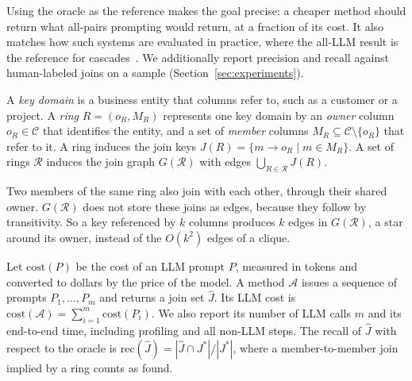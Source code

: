 Using the oracle as the reference makes the goal precise: a cheaper method should return what all-pairs prompting would return, at a fraction of its cost.
It also matches how such systems are evaluated in practice, where the all-LLM result is the reference for cascades~\cite{SUPG,BARGAIN,FDJ}.
We additionally report precision and recall against human-labeled joins on a sample (Section~\ref{sec:experiments}).

\begin{definition}
A \emph{key domain} is a business entity that columns refer to, such as a customer or a project.
A \emph{ring} $R = (o_R, M_R)$ represents one key domain by an \emph{owner} column $o_R \in \mathcal{C}$ that identifies the entity, and a set of \emph{member} columns $M_R \subseteq \mathcal{C} \setminus \{o_R\}$ that refer to it.
A ring induces the join keys $J(R) = \{ m \rightarrow o_R \mid m \in M_R \}$.
A set of rings $\mathcal{R}$ induces the join graph $G(\mathcal{R})$ with edges $\bigcup_{R \in \mathcal{R}} J(R)$.
\end{definition}

Two members of the same ring also join with each other, through their shared owner.
$G(\mathcal{R})$ does not store these joins as edges, because they follow by transitivity.
So a key referenced by $k$ columns produces $k$ edges in $G(\mathcal{R})$, a star around its owner, instead of the $O(k^2)$ edges of a clique.

 Let $\mathrm{cost}(P)$ be the cost of an LLM prompt $P$, measured in tokens and converted to dollars by the price of the model.
A method $\mathcal{A}$ issues a sequence of prompts $P_1, \ldots, P_m$ and returns a join set $\hat{J}$.
Its LLM cost is $\mathrm{cost}(\mathcal{A}) = \sum_{i=1}^{m} \mathrm{cost}(P_i)$.
We also report its number of LLM calls $m$ and its end-to-end time, including profiling and all non-LLM steps.
The recall of $\hat{J}$ with respect to the oracle is $\mathrm{rec}(\hat{J}) = |\hat{J} \cap J^*| / |J^*|$, where a member-to-member join implied by a ring counts as found.

